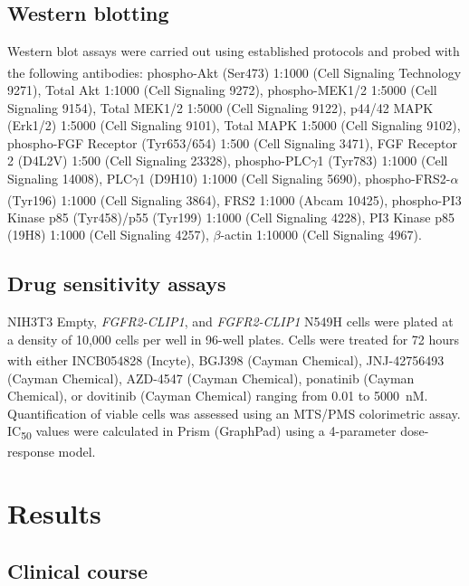 \subsection{Western blotting}
Western blot assays were carried out using established protocols and probed with the following antibodies: phospho-Akt (Ser473) 1:1000 (Cell Signaling Technology\textsuperscript\textregistered{} 9271), Total Akt 1:1000 (Cell Signaling 9272), phospho-MEK1/2 1:5000 (Cell Signaling 9154), Total MEK1/2 1:5000 (Cell Signaling 9122), p44/42 MAPK (Erk1/2) 1:5000 (Cell Signaling 9101), Total MAPK 1:5000 (Cell Signaling 9102), phospho-FGF Receptor (Tyr653/654) 1:500 (Cell Signaling 3471), FGF Receptor 2 (D4L2V) 1:500 (Cell Signaling 23328),  phospho-PLC$\gamma$1 (Tyr783) 1:1000 (Cell Signaling 14008), PLC$\gamma$1 (D9H10) 1:1000 (Cell Signaling 5690), phospho-FRS2\nobreakdash-$\alpha$ (Tyr196) 1:1000 (Cell Signaling 3864), FRS2 1:1000 (Abcam\textsuperscript\textregistered{} 10425), phospho-PI3 Kinase p85 (Tyr458)/p55 (Tyr199) 1:1000 (Cell Signaling 4228), PI3 Kinase p85 (19H8) 1:1000 (Cell Signaling 4257), $\beta$-actin 1:10000 (Cell Signaling 4967).

\subsection{Drug sensitivity assays}
NIH3T3 Empty, \textit{FGFR2-CLIP1}, and \textit{FGFR2-CLIP1} N549H cells were plated at a density of 10,000 cells per well in 96-well plates. Cells were treated for 72 hours with either INCB054828 (Incyte\textsuperscript\textregistered{}), BGJ398 (Cayman Chemical\textsuperscript\textregistered{}), JNJ-42756493 (Cayman Chemical), AZD-4547 (Cayman Chemical), ponatinib (Cayman Chemical), or dovitinib (Cayman Chemical) ranging from 0.01 to 5000~nM\@. Quantification of viable cells was assessed using an MTS/PMS colorimetric assay. IC\textsubscript{50} values were calculated in Prism (GraphPad) using a 4-parameter dose-response model.

\section{Results}
\subsection{Clinical course}

